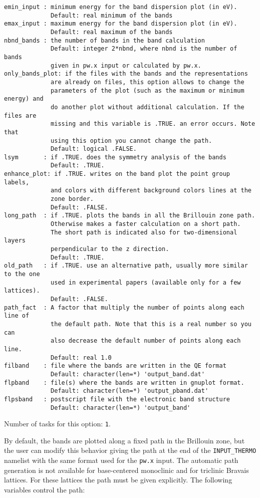 \documentclass[12pt,a4paper]{article}
\begin{document}
\begin{verbatim}
emin_input : minimum energy for the band dispersion plot (in eV).
             Default: real minimum of the bands
emax_input : maximum energy for the band dispersion plot (in eV).
             Default: real maximum of the bands
nbnd_bands : the number of bands in the band calculation
             Default: integer 2*nbnd, where nbnd is the number of bands 
             given in pw.x input or calculated by pw.x.
only_bands_plot: if the files with the bands and the representations
             are already on files, this option allows to change the 
             parameters of the plot (such as the maximum or minimum energy) and
             do another plot without additional calculation. If the files are
             missing and this variable is .TRUE. an error occurs. Note that
             using this option you cannot change the path.
             Default: logical .FALSE.
lsym       : if .TRUE. does the symmetry analysis of the bands
             Default: .TRUE.
enhance_plot: if .TRUE. writes on the band plot the point group labels,
             and colors with different background colors lines at the 
             zone border.
             Default: .FALSE.
long_path  : if .TRUE. plots the bands in all the Brillouin zone path. 
             Otherwise makes a faster calculation on a short path. 
             The short path is indicated also for two-dimensional layers 
             perpendicular to the z direction.
             Default: .TRUE.
old_path   : if .TRUE. use an alternative path, usually more similar to the one
             used in experimental papers (available only for a few lattices).
             Default: .FALSE.
path_fact  : A factor that multiply the number of points along each line of 
             the default path. Note that this is a real number so you can 
             also decrease the default number of points along each line.
             Default: real 1.0
filband    : file where the bands are written in the QE format
             Default: character(len=*) 'output_band.dat'
flpband    : file(s) where the bands are written in gnuplot format.
             Default: character(len=*) 'output_pband.dat'
flpsband   : postscript file with the electronic band structure
             Default: character(len=*) 'output_band'
\end{verbatim}
Number of tasks for this option: \texttt{1}.

By default, the bands are plotted along a fixed path in the Brillouin
zone, but the user can modify this behavior giving the path at the end of 
the \texttt{INPUT\_THERMO} namelist with the same format used for 
the \texttt{pw.x} input. The automatic path generation is not available 
for base-centered monoclinic and for triclinic Bravais lattices. For these
lattices the path must be given explicitly.
The following variables control the path:
\end{document}
